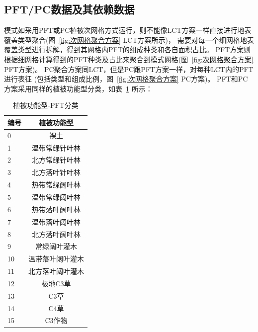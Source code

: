 \subsection{PFT/PC数据及其依赖数据}\label{PFTPC数据及其依赖数据}
模式如采用PFT或PC植被次网格方式运行，则不能像LCT方案一样直接进行地表覆盖类型聚合(图~\ref{fig:次网格聚合方案} LCT方案所示)，
需要对每一个细网格地表覆盖类型进行拆解，得到其网格内PFT的组成种类和各自面积占比。
PFT方案则根据细网格计算得到的PFT种类及占比来聚合到模式网格(图~\ref{fig:次网格聚合方案} PFT方案)。
PC聚合方案同LCT，但是PC跟PFT方案一样，对每种LCT内的PFT进行表征 (包括类型和组成比例，图~\ref{fig:次网格聚合方案} PC方案)。
PFT和PC方案采用同样的植被功能型分类，如表~\ref{tab:PFT分类} 所示：
\begin{table}[]
\centering
\caption{植被功能型-PFT分类}
\label{tab:PFT分类}
\begin{tabular}{@{}lc@{}}
\toprule
\multicolumn{1}{c}{编号} & \multicolumn{1}{c}{植被功能型} \\ \midrule
0                      & 裸土                        \\
1                      & 温带常绿针叶林                   \\
2                      & 北方常绿针叶林                   \\
3                      & 北方落叶针叶林                   \\
4                      & 热带常绿阔叶林                   \\
5                      & 温带常绿阔叶林                   \\
6                      & 热带落叶阔叶林                   \\
7                      & 温带落叶阔叶林                   \\
8                      & 北方落叶阔叶林                   \\
9                      & 常绿阔叶灌木                    \\
10                     & 温带落叶阔叶灌木                  \\
11                     & 北方落叶阔叶灌木                  \\
12                     & 极地C3草                     \\
13                     & C3草                       \\
14                     & C4草                       \\
15                     & C3作物                      \\ \bottomrule
\end{tabular}
\end{table}

